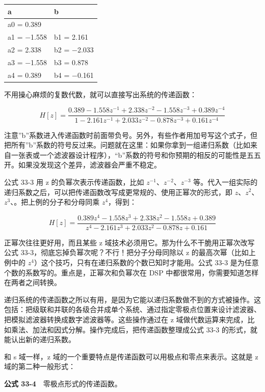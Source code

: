 {\def\LTcaptype{none} %
\begin{longtable}[]{@{}ll@{}}
\toprule\noalign{}
a & b \\
\midrule\noalign{}
\endhead
\bottomrule\noalign{}
\endlastfoot
a0 = 0.389 & \\
a1 = −1.558 & b1 = 2.161 \\
a2 = 2.338 & b2 = −2.033 \\
a3 = −1.558 & b3 = 0.878 \\
a4 = 0.389 & b4 = −0.161 \\
\end{longtable}
}

不用操心麻烦的复数代数，就可以直接写出系统的传递函数：

\[H[z] = \frac{0.389 - 1.558 z^{-1} + 2.338 z^{-2} - 1.558 z^{-3} + 0.389 z^{-4}}{1 - 2.161 z^{-1} + 2.033 z^{-2} - 0.878 z^{-3} + 0.161 z^{-4}}\]

注意''b''系数进入传递函数时前面带负号。另外，有些作者用加号写这个式子，但把所有''b''系数的符号反过来。问题就在这里：如果你拿到一组递归系数（比如来自一张表或一个滤波器设计程序），``b''系数的符号和你预期的相反的可能性是五五开。如果没发现这个差异，滤波器会严重不稳定。

公式 33-3 用 z 的负幂次表示传递函数，比如
\(z^{-1}\)、\(z^{-2}\)、\(z^{-3}\)
等。代入一组实际的递归系数之后，可以把传递函数改写成更常规的、使用正幂次的形式，即
\(z\)、\(z^2\)、\(z^3\)、。把上例的分子和分母同乘
\(z^4\)，得到：

\[H[z] = \frac{0.389 z^{4} - 1.558 z^{3} + 2.338 z^{2} - 1.558 z + 0.389}{z^{4} - 2.161 z^{3} + 2.033 z^{2} - 0.878 z + 0.161}\]

正幂次往往更好用，而且某些 z
域技术必须用它。那为什么不干脆用正幂次改写公式
33-3，彻底忘掉负幂次呢？不行！把分子分母同除以 z
的最高次幂（比如上例中的
\(z^4\)）这个技巧，只有在递归系数的个数已知时才能用。公式 33-3
是为任意个数的系数写的。重点是，正幂次和负幂次在 DSP
中都很常用，你需要知道怎样在两者之间转换。

递归系统的传递函数之所以有用，是因为它能以递归系数做不到的方式被操作。这包括：把级联和并联的各级合并成单个系统、通过指定零极点位置来设计滤波器、把模拟滤波器转换成数字滤波器等。这些操作通过在
z
域做代数运算来完成，比如乘法、加法和因式分解。操作完成后，把传递函数整理成公式
33-3 的形式，就能认出新的递归系数。

和 s 域一样，z 域的一个重要特点是传递函数可以用极点和零点来表示。这就是
z 域的第二种一般形式：

\textbf{公式 33-4}　零极点形式的传递函数。

